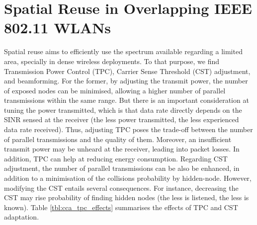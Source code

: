 \documentclass[12pt, a4paper,twoside]{tesi_upf}
\begin{document}
		\section{Spatial Reuse in Overlapping IEEE 802.11 WLANs}
		\label{section:spatial_reuse}	
			Spatial reuse aims to efficiently use the spectrum available regarding a limited area, specially in dense wireless deployments. To that purpose, we find Transmission Power Control (TPC), Carrier Sense Threshold (CST) adjustment, and beamforming. For the former, by adjusting the transmit power, the number of exposed nodes can be minimised, allowing a higher number of parallel transmissions within the same range. But there is an important consideration at tuning the power transmitted, which is that data rate directly depends on the SINR sensed at the receiver (the less power transmitted, the less experienced data rate received). Thus, adjusting TPC poses the trade-off between the number of parallel transmissions and the quality of them. Moreover, an insufficient transmit power may be unheard at the receiver, leading into packet losses. In addition, TPC can help at reducing energy consumption. Regarding CST adjustment, the number of parallel transmissions can be also be enhanced, in addition to a minimisation of the collisions probability by hidden-node. However, modifying the CST entails several consequences. For instance, decreasing the CST may rise probability of finding hidden nodes (the less is listened, the less is known). Table \ref{tbl:cca_tpc_effects} summarises the effects of TPC and CST adaptation.			
\end{document}
